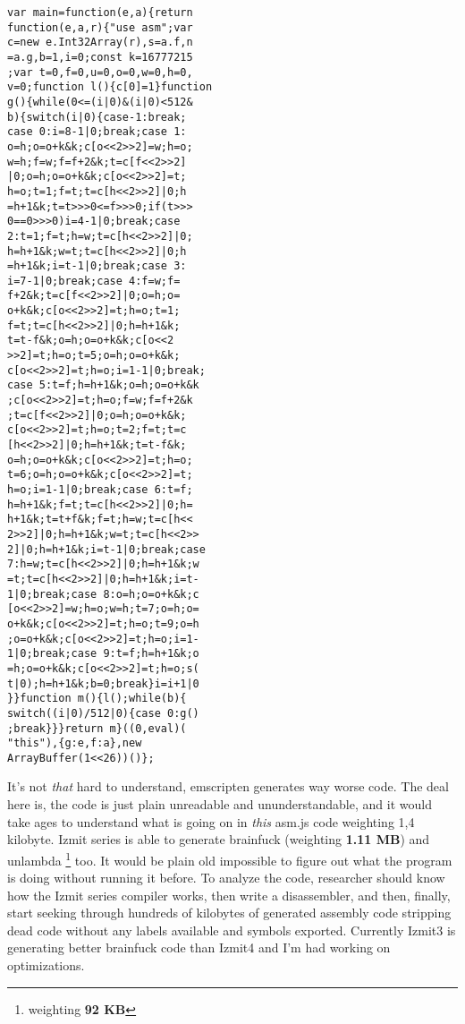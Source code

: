 \documentclass{article}
\begin{document}
\begin{multicols}{2}
\begin{verbatim}
var main=function(e,a){return
function(e,a,r){"use asm";var
c=new e.Int32Array(r),s=a.f,n
=a.g,b=1,i=0;const k=16777215
;var t=0,f=0,u=0,o=0,w=0,h=0,
v=0;function l(){c[0]=1}function
g(){while(0<=(i|0)&(i|0)<512&
b){switch(i|0){case-1:break;
case 0:i=8-1|0;break;case 1:
o=h;o=o+k&k;c[o<<2>>2]=w;h=o;
w=h;f=w;f=f+2&k;t=c[f<<2>>2]
|0;o=h;o=o+k&k;c[o<<2>>2]=t;
h=o;t=1;f=t;t=c[h<<2>>2]|0;h
=h+1&k;t=t>>>0<=f>>>0;if(t>>>
0==0>>>0)i=4-1|0;break;case
2:t=1;f=t;h=w;t=c[h<<2>>2]|0;
h=h+1&k;w=t;t=c[h<<2>>2]|0;h
=h+1&k;i=t-1|0;break;case 3:
i=7-1|0;break;case 4:f=w;f=
f+2&k;t=c[f<<2>>2]|0;o=h;o=
o+k&k;c[o<<2>>2]=t;h=o;t=1;
f=t;t=c[h<<2>>2]|0;h=h+1&k;
t=t-f&k;o=h;o=o+k&k;c[o<<2
>>2]=t;h=o;t=5;o=h;o=o+k&k;
c[o<<2>>2]=t;h=o;i=1-1|0;break;
case 5:t=f;h=h+1&k;o=h;o=o+k&k
;c[o<<2>>2]=t;h=o;f=w;f=f+2&k
;t=c[f<<2>>2]|0;o=h;o=o+k&k;
c[o<<2>>2]=t;h=o;t=2;f=t;t=c
[h<<2>>2]|0;h=h+1&k;t=t-f&k;
o=h;o=o+k&k;c[o<<2>>2]=t;h=o;
t=6;o=h;o=o+k&k;c[o<<2>>2]=t;
h=o;i=1-1|0;break;case 6:t=f;
h=h+1&k;f=t;t=c[h<<2>>2]|0;h=
h+1&k;t=t+f&k;f=t;h=w;t=c[h<<
2>>2]|0;h=h+1&k;w=t;t=c[h<<2>>
2]|0;h=h+1&k;i=t-1|0;break;case
7:h=w;t=c[h<<2>>2]|0;h=h+1&k;w
=t;t=c[h<<2>>2]|0;h=h+1&k;i=t-
1|0;break;case 8:o=h;o=o+k&k;c
[o<<2>>2]=w;h=o;w=h;t=7;o=h;o=
o+k&k;c[o<<2>>2]=t;h=o;t=9;o=h
;o=o+k&k;c[o<<2>>2]=t;h=o;i=1-
1|0;break;case 9:t=f;h=h+1&k;o
=h;o=o+k&k;c[o<<2>>2]=t;h=o;s(
t|0);h=h+1&k;b=0;break}i=i+1|0
}}function m(){l();while(b){
switch((i|0)/512|0){case 0:g()
;break}}}return m}((0,eval)(
"this"),{g:e,f:a},new
ArrayBuffer(1<<26))()};
\end{verbatim}
\end{multicols}

\par It's not \textit{that} hard to understand, emscripten generates way worse code. The deal here is, the code is just plain unreadable and ununderstandable, and it would take ages to understand what is going on in \textit{this} asm.js code weighting 1,4 kilobyte. Izmit series is able to generate brainfuck (weighting \textbf{1.11 MB}) and unlambda \footnote{weighting \textbf{92 KB}} too. It would be plain old impossible to figure out what the program is doing without running it before. To analyze the code, researcher should know how the Izmit series compiler works, then write a disassembler, and then, finally, start seeking through hundreds of kilobytes of generated assembly code stripping dead code without any labels available and symbols exported. Currently Izmit3 is generating better brainfuck code than Izmit4 and I'm had working on optimizations.
\end{document}
